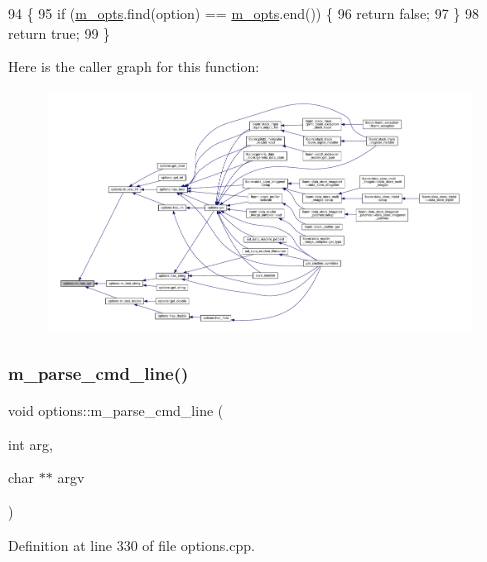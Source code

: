 \begin{DoxyCode}
94 \{
95   \textcolor{keywordflow}{if} (\hyperlink{classoptions_ac73507ca925d98ee5ff6f04937dff5c3}{m\_opts}.find(option) == \hyperlink{classoptions_ac73507ca925d98ee5ff6f04937dff5c3}{m\_opts}.end()) \{
96     \textcolor{keywordflow}{return} \textcolor{keyword}{false};
97   \}
98   \textcolor{keywordflow}{return} \textcolor{keyword}{true};
99 \}
\end{DoxyCode}
Here is the caller graph for this function\+:\nopagebreak
\begin{figure}[H]
\begin{center}
\leavevmode
\includegraphics[width=350pt]{classoptions_a99183ba43c8d7b35dbfa1bea0f43db48_icgraph}
\end{center}
\end{figure}
\mbox{\label{classoptions_a441540f2a8990edaa17fe95b013f9168}} 
\subsubsection{\texorpdfstring{m\+\_\+parse\+\_\+cmd\+\_\+line()}{m\_parse\_cmd\_line()}}
{\footnotesize\ttfamily void options\+::m\+\_\+parse\+\_\+cmd\+\_\+line (\begin{DoxyParamCaption}\item[{int}]{arg,  }\item[{char $\ast$$\ast$}]{argv }\end{DoxyParamCaption})\hspace{0.3cm}{\ttfamily [private]}}



Definition at line 330 of file options.\+cpp.


